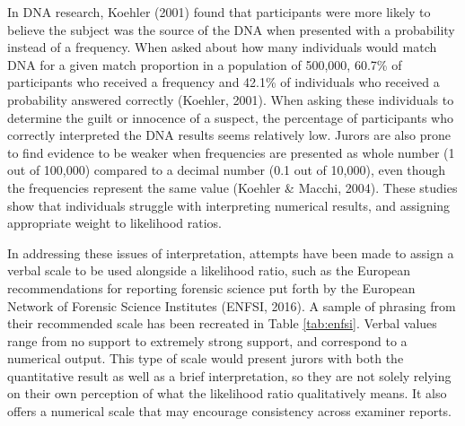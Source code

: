 \documentclass[print]{nuthesis}
\begin{document}
In DNA research, Koehler (2001) found that participants were more likely to believe the subject was the source of the DNA when presented with a probability instead of a frequency.
When asked about how many individuals would match DNA for a given match proportion in a population of 500,000, 60.7\% of participants who received a frequency and 42.1\% of individuals who received a probability answered correctly (Koehler, 2001).
When asking these individuals to determine the guilt or innocence of a suspect, the percentage of participants who correctly interpreted the DNA results seems relatively low.
Jurors are also prone to find evidence to be weaker when frequencies are presented as whole number (1 out of 100,000) compared to a decimal number (0.1 out of 10,000), even though the frequencies represent the same value (Koehler \& Macchi, 2004).
These studies show that individuals struggle with interpreting numerical results, and assigning appropriate weight to likelihood ratios.

In addressing these issues of interpretation, attempts have been made to assign a verbal scale to be used alongside a likelihood ratio, such as the European recommendations for reporting forensic science put forth by the European Network of Forensic Science Institutes (ENFSI, 2016).
A sample of phrasing from their recommended scale has been recreated in Table \ref{tab:enfsi}.
Verbal values range from no support to extremely strong support, and correspond to a numerical output.
This type of scale would present jurors with both the quantitative result as well as a brief interpretation, so they are not solely relying on their own perception of what the likelihood ratio qualitatively means.
It also offers a numerical scale that may encourage consistency across examiner reports.
\end{document}
